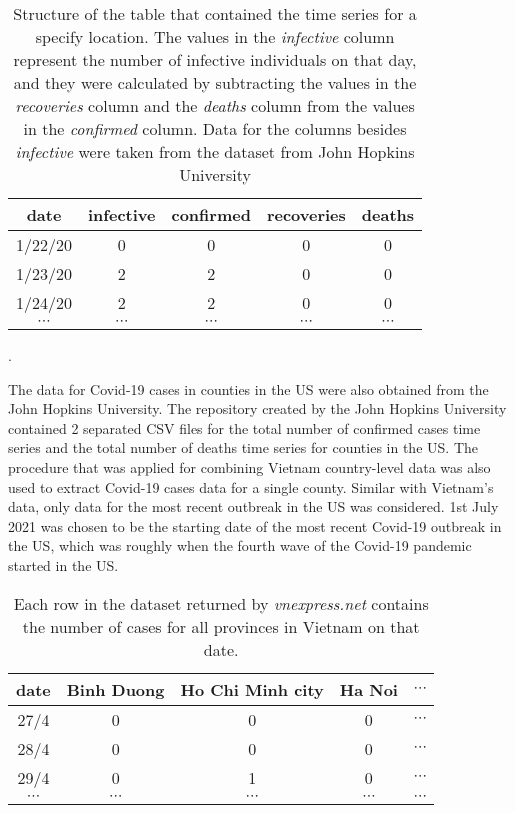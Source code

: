 \begin{table}[h]
\centering
\begin{tabular}{| c | c | c | c | c |}
    date & infective & confirmed & recoveries & deaths \\
    \hline\hline
    1/22/20 & 0 & 0 & 0 & 0 \\
    \hline
    1/23/20 & 2 & 2 & 0 & 0 \\
    \hline
    1/24/20 & 2 & 2 & 0 & 0 \\
    \hline
    $\cdots$ & $\cdots$ & $\cdots$ & $\cdots$ & $\cdots$ \\
\end{tabular}
\caption{Structure of the table that contained the time series for a specify location. The values in the \textit{infective} column represent the number of infective individuals on that day, and they were calculated by subtracting the values in the \textit{recoveries} column and the \textit{deaths} column from the values in the \textit{confirmed} column. Data for the columns besides \textit{infective} were taken from the dataset from John Hopkins University \cite{dongInteractiveWebbasedDashboard2020}}.
\label{tab:country-covid-timeseries}
\end{table}

The data for Covid-19 cases in counties in the \gls{US} were also obtained from the John Hopkins University.
The repository created by the John Hopkins University \cite{dongInteractiveWebbasedDashboard2020} contained 2 separated CSV files for the total number of confirmed cases time series and the total number of deaths time series for counties in the \gls{US}.
The procedure that was applied for combining Vietnam country-level data was also used to extract Covid-19 cases data for a single county.
Similar with Vietnam's data, only data for the most recent outbreak in the \gls{US} was considered.
1st July 2021 was chosen to be the starting date of the most recent Covid-19 outbreak in the US, which was roughly when the fourth wave of the Covid-19 pandemic started in the \gls{US}.

\begin{table}[h]
\centering
\begin{tabular}{|c | c | c | c | c }
    date & Binh Duong & Ho Chi Minh city & Ha Noi & $\cdots$ \\
    \hline\hline
    27/4 & 0 & 0 & 0 & $\cdots$ \\
    \hline
    28/4 & 0 & 0 & 0 & $\cdots$ \\
    \hline
    29/4 & 0 & 1 & 0 & $\cdots$ \\
    \hline
    $\cdots$ & $\cdots$ & $\cdots$ & $\cdots$ & $\cdots$ \\
\end{tabular}
\caption{Each row in the dataset returned by \textit{vnexpress.net} contains the number of cases for all provinces in Vietnam on that date.}
\label{tab:vietnam-provinces-timeseries}
\end{table}

